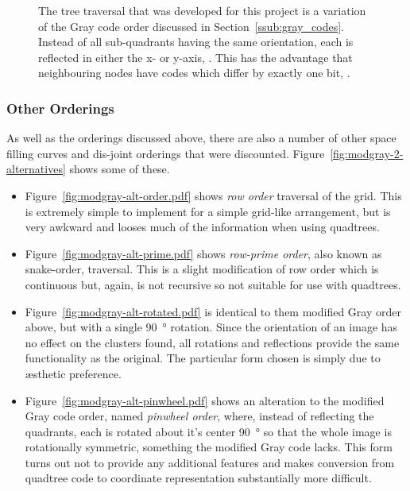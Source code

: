 \begin{figure}[tbhp]
	\caption[Modified Gray Code ordering]{The tree traversal that was developed
		for this project is a variation of the Gray code order discussed in
		Section~\ref{ssub:gray_codes}.  Instead of all sub-quadrants having the
		same orientation, each is reflected in either the x- or y-axis,
		. This has the advantage that
		neighbouring nodes have codes which differ by exactly one bit,
		.}\label{fig:modgray-traversal}
\end{figure}


\subsubsection{Other Orderings}
\label{ssub:other_orderings}

As well as the orderings discussed above, there are also a number of other
space filling curves and dis-joint orderings that were discounted.
Figure~\ref{fig:modgray-2-alternatives} shows some of these.

\begin{itemize}

	\item Figure~\ref{fig:modgray-alt-order.pdf} shows \emph{row order}
		traversal of the grid. This is extremely simple to implement for a
		simple grid-like arrangement, but is very awkward and looses much of
		the information when using quadtrees.

	\item Figure~\ref{fig:modgray-alt-prime.pdf} shows \emph{row-prime order},
		also known as snake-order\cite{goodchild1983optimizing}, traversal.
		This is a slight modification of row order which is continuous but,
		again, is not recursive so not suitable for use with quadtrees.

	\item Figure~\ref{fig:modgray-alt-rotated.pdf} is identical to them
		modified Gray order above, but with a single \SI{90}{\degree} rotation.
		Since the orientation of an image has no effect on the clusters found,
		all rotations and reflections provide the same functionality as the
		original. The particular form chosen is simply due to {\ae}sthetic
		preference.

	\item Figure~\ref{fig:modgray-alt-pinwheel.pdf} shows an alteration to the
		modified Gray code order, named \emph{pinwheel order}, where, instead of
		reflecting the quadrants, each is rotated about it's center
		\SI{90}{\degree} so that the whole image is rotationally symmetric,
		something the modified Gray code lacks.  This form turns out not to
		provide any additional features and makes conversion from quadtree code
		to coordinate representation substantially more difficult.

\end{itemize}

